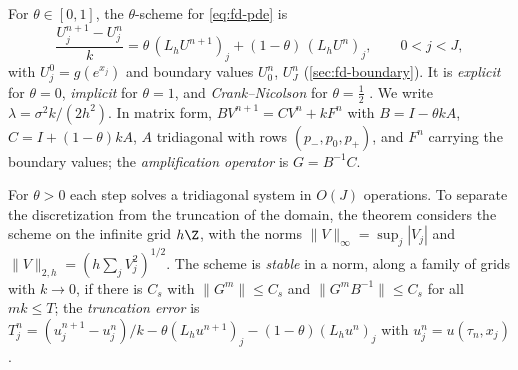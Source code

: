 \begin{definition}\label{def:fd-theta}
For $\theta\in[0,1]$, the $\theta$-scheme for \eqref{eq:fd-pde} is
\begin{equation}\label{eq:fd-theta}
  \frac{U^{n+1}_j-U^n_j}{k}=\theta\,(L_hU^{n+1})_j+(1-\theta)\,(L_hU^n)_j,\qquad 0<j<J,
\end{equation}
with $U^0_j=g(e^{x_j})$ and boundary values $U^n_0$, $U^n_J$ (\cref{sec:fd-boundary}). It is
\emph{explicit} for $\theta=0$, \emph{implicit} for $\theta=1$, and \emph{Crank--Nicolson} for $\theta=\frac12$
\citep{crank-nicolson-1947}. We write $\lambda=\sigma^2k/(2h^2)$. In matrix form,
$BV^{n+1}=CV^n+kF^n$ with $B=I-\theta kA$, $C=I+(1-\theta)kA$, $A$ tridiagonal with rows $(p_-,p_0,p_+)$, and
$F^n$ carrying the boundary values; the \emph{amplification operator} is $G=B^{-1}C$.
\end{definition}

For $\theta>0$ each step solves a tridiagonal system in $O(J)$ operations. To separate the
discretization from the truncation of the domain, the theorem considers the scheme on the
infinite grid $h\Z$, with the norms $\|V\|_\infty=\sup_j|V_j|$ and $\|V\|_{2,h}=(h\sum_jV_j^2)^{1/2}$. The scheme
is \emph{stable} in a norm, along a family of grids with $k\to0$, if there is $C_s$ with
$\|G^m\|\le C_s$ and $\|G^mB^{-1}\|\le C_s$ for all $mk\le T$; the \emph{truncation error} is
$T^n_j=(u^{n+1}_j-u^n_j)/k-\theta(L_hu^{n+1})_j-(1-\theta)(L_hu^n)_j$ with $u^n_j=u(\tau_n,x_j)$.

